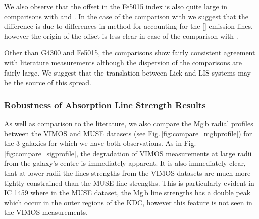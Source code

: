 			\restoregeometry

			We also observe that the offset in the Fe5015 index is also quite large in comparisons with \citet{Rampazzo2005} and \citet{Vazdekis2010}. In the case of the comparison with \citet{Rampazzo2005} we suggest that the difference is due to differences in method for accounting for the [] emission lines, however the origin of the offset is less clear in case of the comparison with \citet{Vazdekis2010}. 

			Other than G4300 and Fe5015, the comparisons show fairly consistent agreement with literature measurements although the dispersion of the comparisons are fairly large. We suggest that the translation between Lick and LIS systems may be the source of this spread.


		\subsubsection{Robustness of Absorption Line Strength Results}
			\label{subsubsec:RobustAbs}
			As well as comparison to the literature, we also compare the Mg\,b radial profiles between the VIMOS and MUSE datasets (see Fig.\,\ref{fig:compare_mgbprofile}) for the 3 galaxies for which we have both observations. As in Fig.\,\ref{fig:compare_sigprofile}, the degradation of VIMOS measurements at large radii from the galaxy's centre is immediately apparent. It is also immediately clear, that at lower radii the lines strengths from the VIMOS datasets are much more tightly constrained than the MUSE line strengths. This is particularly evident in IC 1459 where in the MUSE dataset, the Mg\,b line strengths has a double peak which occur in the outer regions of the KDC, however this feature is not seen in the VIMOS measurements. 

